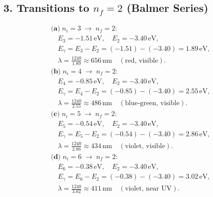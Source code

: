 \documentclass[12pt]{article}
\theoremstyle{definition} %
\theoremstyle{plain} %
\begin{document}
\subsection*{3. Transitions to \texorpdfstring{$n_f=2$}{n=2} (Balmer Series)}
\[
\begin{aligned}
&\textbf{(a)}\; n_i = 3 \;\longrightarrow\; n_f = 2: \\
&\quad E_{3} = -1.51\,\text{eV}, \quad E_{2} = -3.40\,\text{eV}, \\
&\quad E_{\gamma} = E_{3} - E_{2} = (-1.51) - (-3.40) = 1.89\,\text{eV}, \\
&\quad \lambda = \frac{1240}{1.89} \approx 656\,\text{nm} \quad (\text{red, visible}). \\[6pt]
&\textbf{(b)}\; n_i = 4 \;\longrightarrow\; n_f = 2: \\
&\quad E_{4} = -0.85\,\text{eV}, \quad E_{2} = -3.40\,\text{eV}, \\
&\quad E_{\gamma} = E_{4} - E_{2} = (-0.85) - (-3.40) = 2.55\,\text{eV}, \\
&\quad \lambda = \frac{1240}{2.55} \approx 486\,\text{nm} \quad (\text{blue-green, visible}). \\[6pt]
&\textbf{(c)}\; n_i = 5 \;\longrightarrow\; n_f = 2: \\
&\quad E_{5} = -0.54\,\text{eV}, \quad E_{2} = -3.40\,\text{eV}, \\
&\quad E_{\gamma} = E_{5} - E_{2} = (-0.54) - (-3.40) = 2.86\,\text{eV}, \\
&\quad \lambda = \frac{1240}{2.86} \approx 434\,\text{nm} \quad (\text{violet, visible}). \\[6pt]
&\textbf{(d)}\; n_i = 6 \;\longrightarrow\; n_f = 2: \\
&\quad E_{6} = -0.38\,\text{eV}, \quad E_{2} = -3.40\,\text{eV}, \\
&\quad E_{\gamma} = E_{6} - E_{2} = (-0.38) - (-3.40) = 3.02\,\text{eV}, \\
&\quad \lambda = \frac{1240}{3.02} \approx 411\,\text{nm} \quad (\text{violet, near UV}).
\end{aligned}
\]
\end{document}
